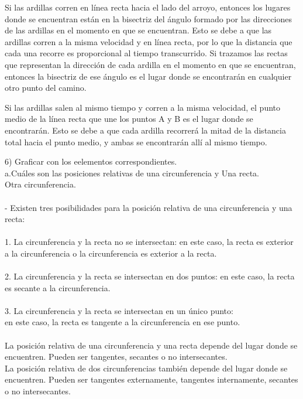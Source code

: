 \documentclass{article}
\begin{document}
Si las ardillas corren en línea recta hacia el lado del arroyo, entonces los lugares donde se encuentran están en la bisectriz del ángulo formado por las direcciones de las ardillas en el momento en que se encuentran. Esto se debe a que las ardillas corren a la misma velocidad y en línea recta, por lo que la distancia que cada una recorre es proporcional al tiempo transcurrido. Si trazamos las rectas que representan la dirección de cada ardilla en el momento en que se encuentran, entonces la bisectriz de ese ángulo es el lugar donde se encontrarán en cualquier otro punto del camino.

Si las ardillas salen al mismo tiempo y corren a la misma velocidad, el punto medio de la línea recta que une los puntos A y B es el lugar donde se encontrarán. Esto se debe a que cada ardilla recorrerá la mitad de la distancia total hacia el punto medio, y ambas se encontrarán allí al mismo tiempo. 

6) Graficar con los eelementos correspondientes. \\
a.Cuáles son las posiciones relativas de una circunferencia y Una recta.\\
Otra circunferencia.  \\
 \\
- Existen tres posibilidades para la posición relativa de una circunferencia y una recta: \\
 \\
1. La circunferencia y la recta no se intersectan: en este caso, la recta es exterior a la circunferencia o la circunferencia es exterior a la recta. \\
 \\
2. La circunferencia y la recta se intersectan en dos puntos: en este caso, la recta es secante a la circunferencia. \\
 \\
3. La circunferencia y la recta se intersectan en un único punto: \\
en este caso, la recta es tangente a la circunferencia en ese punto. \\
 \\
La posición relativa de una circunferencia y una recta depende del lugar donde se encuentren. Pueden ser tangentes, secantes o no intersecantes. \\

La posición relativa de dos circunferencias también depende del lugar donde se encuentren. Pueden ser tangentes externamente, tangentes internamente, secantes o no intersecantes. \\
\end{document}
